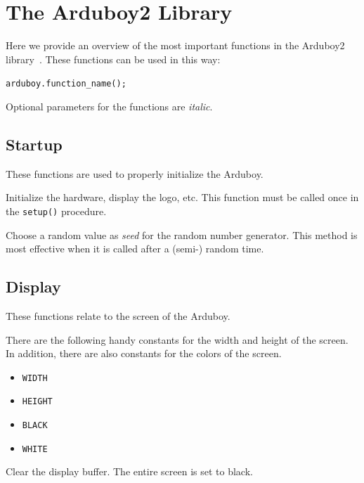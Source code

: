 \documentclass[11pt,fleqn]{book} %
\begin{document}
\section{The Arduboy2 Library}
Here we provide an overview of the most important functions in the Arduboy2 library~\cite{arduboy:lib2-doc}. These functions can be used in this way:

\begin{center}
	\texttt{arduboy.function\_name();}
\end{center}
\noindent
Optional parameters for the functions are \emph{italic}.

\subsection{Startup}
These functions are used to properly initialize the Arduboy.

\begin{libf}[begin()]
	Initialize the hardware, display the logo, etc. This function must be called once in the \texttt{setup()} procedure.
\end{libf}

\begin{libf}[initRandomSeed()]
    Choose a random value as \emph{seed} for the random number generator. This method is most effective when it is called after a (semi-) random time.
\end{libf}

\subsection{Display}
These functions relate to the screen of the Arduboy.

\begin{libf}
	There are the following handy constants for the width and height of the screen. In addition, there are also constants for the colors of the screen.
	\begin{multicols}{2}
		\begin{itemize}
			\item \texttt{WIDTH}
			\item \texttt{HEIGHT}
			\item \texttt{BLACK}
			\item \texttt{WHITE}
		\end{itemize}
	\end{multicols}
\end{libf}

\begin{libf}[clear()]
	Clear the display buffer. The entire screen is set to black.
\end{libf}
\end{document}
